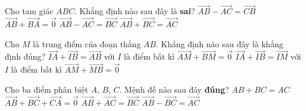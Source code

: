 

\begin{ex}%
	Cho tam giác $ABC$. Khẳng định nào sau  đây là \textbf{sai}?
	 \choice
		 {$\overrightarrow{AB}-\overrightarrow{AC}=\overrightarrow{CB}$}
		 {$\overrightarrow{AB}+\overrightarrow{BA}=\overrightarrow{0}$}
		{\True $\overrightarrow{AB}-\overrightarrow{AC}=\overrightarrow{BC}$} 
		 {$\overrightarrow{AB}+\overrightarrow{BC}=\overrightarrow{AC}$}
\end{ex}

\begin{ex}%
	Cho $M$ là trung  điểm của đoạn thẳng $AB$. Khẳng định nào sau đây là khẳng định đúng?
	\choice 
		{$\overrightarrow{IA}+\overrightarrow{IB}=\overrightarrow{AB}$  với $I$ là điểm bất kì}
		{\True $\overrightarrow{AM}+\overrightarrow{BM}=\overrightarrow{0}$} 
		{$\overrightarrow{IA}+\overrightarrow{IB}=\overrightarrow{IM}$ với $I$ là điểm bất kì} 
		 {$\overrightarrow{AM}+\overrightarrow{MB}=\overrightarrow{0}$}
\end{ex}

\begin{ex}%
	Cho ba điểm phân biệt $A$, $B$, $C$.  Mệnh đề nào sau đây \textbf{đúng}?
	 \choice
		 {$AB+BC=AC$}
		{\True $\overrightarrow{AB}+\overrightarrow{BC}+\overrightarrow{CA}=\overrightarrow{0}$} 
		 {$\overrightarrow{AB}+\overrightarrow{AC}=\overrightarrow{BC}$}
		 {$\overrightarrow{AB}-\overrightarrow{BC}=\overrightarrow{AC}$}
\end{ex}

